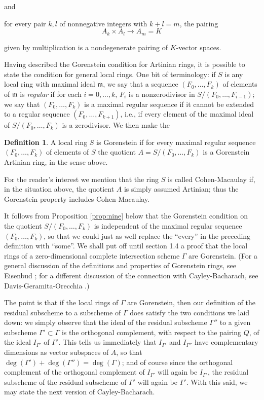\documentclass{bull-l}
\theoremstyle{pplain}
\theoremstyle{definition}
\newtheorem*{dfn}{Definition}
\begin{document}
\noindent
and

for every pair $k,l$ of nonnegative integers with $k+l=m$, the pairing
\[A_k\times A_l\to A_m=K\]

given by multiplication is a nondegenerate pairing of $K$-vector spaces.

Having described the Gorenstein condition for Artinian rings, it is
possible to state the condition for general local rings.  One bit of
terminology: if $S$ is any local ring with maximal ideal $\mathfrak{m}$, we say
that a sequence $(F_0,\dots, F_k)$ of elements of $\mathfrak{m}$ 
is \emph{regular} if for
each $i=0,\dots,k$, $F_i$ is a nonzerodivisor in $S/(F_0,\dots,F_{i-1})$; we
say that $(F_0,\dots,F_k)$ is a maximal regular sequence if it cannot be
extended to a regular sequence $(F_0,\dots,F_{k+1})$, 
i.e., if every element of the maximal ideal of $S/(F_0,\dots,F_k)$ is a
zerodivisor.  We then make the 

\begin{dfn}
A local ring $S$ is Gorenstein if for every maximal regular sequence
$(F_0,\dots,F_k)$ of elements of $S$ the quotient $A=S/(F_0,\dots,F_k)$ is a
Gorenstein Artinian ring, in the sense above.
\end{dfn}

For the reader's interest we mention that the ring $S$ is called Cohen-Macaulay
if, in the situation above, the quotient $A$ is simply assumed Artinian; thus
the Gorenstein property includes Cohen-Macaulay.

It follows from Proposition \ref{prop:nine} below that the Gorenstein condition
on the quotient 
$S/(F_0,\dots,F_k)$ is independent of the maximal regular sequence 
$(F_0,\dots,F_k)$, so that we could just as well replace the ``every'' in 
the preceding definition with ``some''.  We shall put off until section
1.4 a proof that the local
rings of a zero-dimensional complete intersection scheme $\Gamma$ are 
Gorenstein. (For a general
discussion of the definitions and properties of Gorenstein rings, see Eisenbud
\cite[Ch.\ 21]{E}; for a different discussion of the connection with
Cayley-Bacharach, see Davis-Geramita-Orecchia \cite{DGO}.)


The point is that if the local rings of $\Gamma$ are Gorenstein, then our  
definition of the residual subscheme to a subscheme of $\Gamma$ does 
satisfy the two conditions we laid down: we simply observe that the ideal
of the residual subscheme $\Gamma''$ to a given subscheme $\Gamma'\subset
\Gamma$ is the orthogonal complement, with respect to the pairing $Q$, of the
ideal $I_{\Gamma'}$ of $\Gamma'$.  This tells us immediately that $I_{\Gamma'}$
and $I_{\Gamma''}$ have complementary dimensions as vector subspaces of $A$, so
that $\deg(\Gamma')+\deg(\Gamma'')=\deg(\Gamma)$; and of course since the 
orthogonal complement of the orthogonal complement of $I_{\Gamma'}$ will again
be $I_{\Gamma'}$, the residual subscheme of the residual subscheme of $\Gamma'$
will again be  $\Gamma'$.  With this said, we may state the next version of
Cayley-Bacharach.
\end{document}
